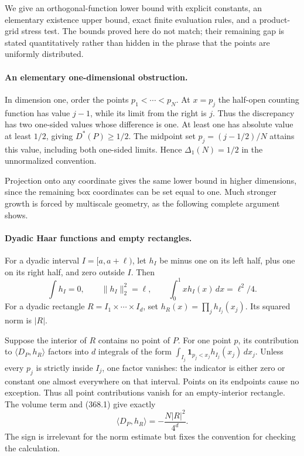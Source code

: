 \documentclass[11pt]{article}
\begin{document}
We give an orthogonal-function lower bound with explicit constants,
an elementary existence upper bound, exact finite evaluation rules,
and a product-grid stress test. The bounds proved here do not match;
their remaining gap is stated quantitatively rather than hidden in
the phrase that the points are uniformly distributed.

\paragraph{An elementary one-dimensional obstruction.}
In dimension one, order the points $p_1<\cdots<p_N$. At $x=p_j$
the half-open counting function has value $j-1$, while its limit
from the right is $j$. Thus the discrepancy has two one-sided values
whose difference is one. At least one has absolute value at least
$1/2$, giving $D^*(P)\geq1/2$. The midpoint set
$p_j=(j-1/2)/N$ attains this value, including both one-sided limits.
Hence $\Delta_1(N)=1/2$ in the unnormalized convention.

Projection onto any coordinate gives the same lower bound in higher
dimensions, since the remaining box coordinates can be set equal
to one. Much stronger growth is forced by multiscale geometry, as
the following complete argument shows.

\paragraph{Dyadic Haar functions and empty rectangles.}
For a dyadic interval $I=[a,a+\ell)$, let $h_I$ be minus one on
its left half, plus one on its right half, and zero outside $I$.
Then
\[
 \int h_I=0,\qquad \|h_I\|_2^2=\ell,\qquad
 \int_0^1 xh_I(x)\,dx=\ell^2/4.
 \tag{368.1}
\]
For a dyadic rectangle $R=I_1\times\cdots\times I_d$, set
$h_R(x)=\prod_jh_{I_j}(x_j)$. Its squared norm is $|R|$.

Suppose the interior of $R$ contains no point of $P$. For one
point $p$, its contribution to $\langle D_P,h_R\rangle$ factors
into $d$ integrals of the form
$\int_{I_j}\mathbf1_{p_j<x_j}h_{I_j}(x_j)\,dx_j$.
Unless every $p_j$ is strictly inside $I_j$, one factor vanishes:
the indicator is either zero or constant one almost everywhere on
that interval. Points on its endpoints cause no exception. Thus all
point contributions vanish for an empty-interior rectangle. The
volume term and (368.1) give exactly
\[
 \langle D_P,h_R\rangle=-\frac{N|R|^2}{4^d}.
 \tag{368.2}
\]
The sign is irrelevant for the norm estimate but fixes the convention
for checking the calculation.
\end{document}
